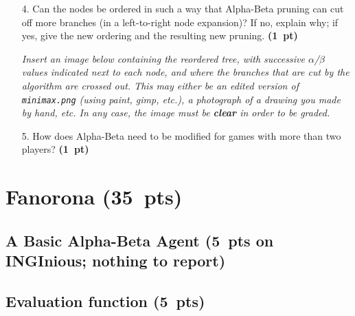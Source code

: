 \documentclass[11pt,a4paper]{report}
\begin{document}
\clearpage
\begin{enumerate}
\item[4.] Can the nodes be ordered in such a way that Alpha-Beta pruning can cut off
      more branches (in a left-to-right node expansion)? If no, explain why; if
      yes, give the new ordering and the resulting new pruning. \textbf{(1~pt)}
      
      \textit{Insert an image below containing the reordered tree, with successive $\alpha$/$\beta$ values indicated next to each node, and where the branches that are cut by the algorithm are crossed out. This may either be an edited version of \texttt{minimax.png} (using paint, gimp, etc.), a photograph of a drawing you made by hand, etc. In any case, the image must be \textbf{clear} in order to be graded.}
\end{enumerate}

\begin{answers}[8cm]
\end{answers}




\begin{enumerate}
\item[5.] How does Alpha-Beta need to be modified for games with more than two players? \textbf{(1~pt)}
\end{enumerate}

\begin{answers}[9cm]
\end{answers}





\clearpage
\section{Fanorona (35~pts)}
\medskip

\subsection{A Basic Alpha-Beta Agent (5~pts on INGInious; nothing to report)}
\medskip


\subsection{Evaluation function (5~pts)}
\end{document}
